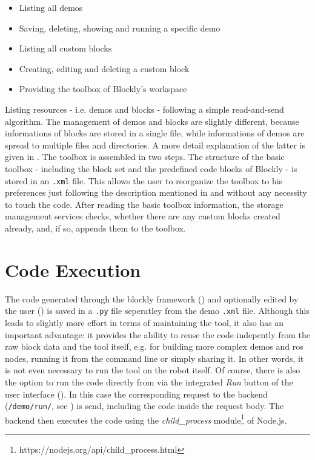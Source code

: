 \begin{itemize}
    \item Listing all demos
    \item Saving, deleting, showing and running a specific demo
    \item Listing all custom blocks
    \item Creating, editing and deleting a custom block
    \item Providing the toolbox of Blockly's workspace
\end{itemize}

Listing resources - i.e. demos and blocks - following a simple read-and-send algorithm. The management of demos and blocks are slightly different, because informations of blocks are stored in a single file, while informations of demos are spread to multiple files and directories. A more detail explanation of the latter is given in . The toolbox is assembled in two steps. The structure of the basic toolbox - including the \hobbit{} block set and the predefined code blocks of Blockly - is stored in an \lstinline!.xml! file. This allows the user to reorganize the toolbox to his preferences just following the description mentioned in  and without any necessity to touch the code. After reading the basic toolbox information, the storage management services checks, whether there are any custom blocks created already, and, if so, appends them to the toolbox.

\section{Code Execution} \label{sec:CodeExecution}
The code generated through the blockly framework () and optionally edited by the user () is saved in a \lstinline!.py! file seperatley from the demo \lstinline!.xml! file. Although this leads to slightly more effort in terms of maintaining the tool, it also has an important advantage: it provides the ability to reuse the code indepently from the raw block data and the tool itself, e.g. for building more complex demos and \gls{ros} nodes, running it from the command line or simply sharing it. In other words, it is not even necessary to run the tool on the robot itself. Of course, there is also the option to run the code directly from \toolname{} via the integrated \textit{Run} button of the user interface (). In this case the corresponding request to the backend (\lstinline!/demo/run/!, see ) is send, including the code inside the request body. The backend then executes the code using the \textit{child\_process} module\footnote{https://nodejs.org/api/child\_process.html} of Node.js.